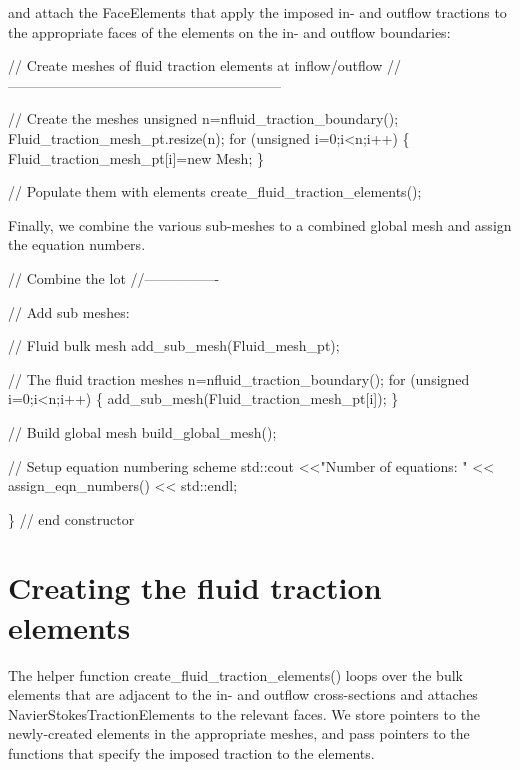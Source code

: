and attach the {\ttfamily Face\+Elements} that apply the imposed in-\/ and outflow tractions to the appropriate faces of the elements on the in-\/ and outflow boundaries\+:


\begin{DoxyCodeInclude}
 
 
 \textcolor{comment}{// Create meshes of fluid traction elements at inflow/outflow}
 \textcolor{comment}{//-----------------------------------------------------------}
 
 \textcolor{comment}{// Create the meshes}
 \textcolor{keywordtype}{unsigned} n=nfluid\_traction\_boundary();
 Fluid\_traction\_mesh\_pt.resize(n);
 \textcolor{keywordflow}{for} (\textcolor{keywordtype}{unsigned} i=0;i<n;i++)
  \{
   Fluid\_traction\_mesh\_pt[i]=\textcolor{keyword}{new} Mesh;
  \} 
 
 \textcolor{comment}{// Populate them with elements}
 create\_fluid\_traction\_elements();

\end{DoxyCodeInclude}


Finally, we combine the various sub-\/meshes to a combined global mesh and assign the equation numbers.


\begin{DoxyCodeInclude}
 
 
 \textcolor{comment}{// Combine the lot}
 \textcolor{comment}{//----------------}
 
 \textcolor{comment}{// Add sub meshes:}

 \textcolor{comment}{// Fluid bulk mesh}
 add\_sub\_mesh(Fluid\_mesh\_pt);
 
 \textcolor{comment}{// The fluid traction meshes}
 n=nfluid\_traction\_boundary();
 \textcolor{keywordflow}{for} (\textcolor{keywordtype}{unsigned} i=0;i<n;i++)
  \{ 
   add\_sub\_mesh(Fluid\_traction\_mesh\_pt[i]);
  \}
 
 \textcolor{comment}{// Build global mesh}
 build\_global\_mesh();

 \textcolor{comment}{// Setup equation numbering scheme}
 std::cout <<\textcolor{stringliteral}{"Number of equations: "} << assign\_eqn\_numbers() << std::endl; 
 
\} \textcolor{comment}{// end constructor}

\end{DoxyCodeInclude}




 

\hypertarget{index_traction}{}\section{Creating the fluid traction elements}\label{index_traction}
The helper function {\ttfamily create\+\_\+fluid\+\_\+traction\+\_\+elements()} loops over the bulk elements that are adjacent to the in-\/ and outflow cross-\/sections and attaches {\ttfamily Navier\+Stokes\+Traction\+Elements} to the relevant faces. We store pointers to the newly-\/created elements in the appropriate meshes, and pass pointers to the functions that specify the imposed traction to the elements.


